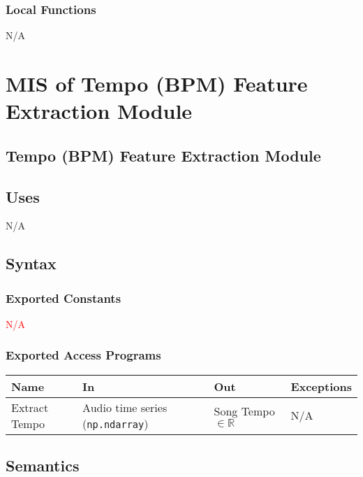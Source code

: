 \documentclass[12pt, titlepage]{article}
\begin{document}
\subsubsection{Local Functions}
N/A



\section{MIS of Tempo (BPM) Feature Extraction Module} 

\subsection{Tempo (BPM) Feature Extraction Module}

\subsection{Uses}
N/A

\subsection{Syntax}

\subsubsection{Exported Constants}
\textcolor{red}{N/A} 

\subsubsection{Exported Access Programs}

\begin{center}
\begin{tabular}{p{2cm} p{4cm} p{4cm} p{2cm}}
\hline
\textbf{Name} & \textbf{In} & \textbf{Out} & \textbf{Exceptions}\\
\hline%
Extract Tempo &Audio time series (\texttt{np.ndarray}) &Song Tempo $\in \mathbb{R}$ &N/A \\
\hline
\end{tabular}
\end{center}

\subsection{Semantics}
\end{document}
